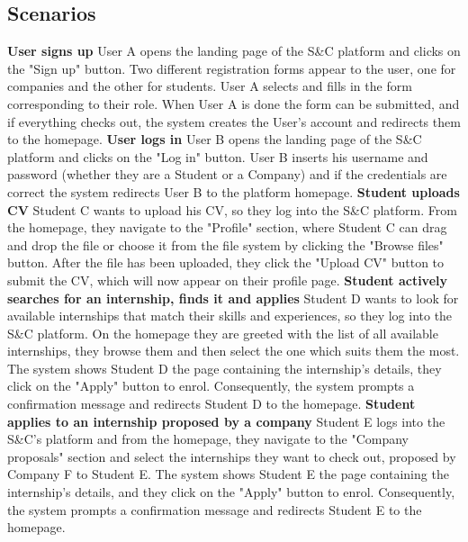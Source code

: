 \subsection{Scenarios }
\textbf{User signs up} \newline
User A opens the landing page of the S\&C platform and clicks on the "Sign up" button. Two different registration forms appear to the user, one for companies and the other for students. User A selects and fills in the form corresponding to their role. When User A is done the form can be submitted, and if everything checks out, the system creates the User's account and redirects them to the homepage.
\newline
\newline
\textbf{User logs in} \newline
User B opens the landing page of the S\&C platform and clicks on the "Log in" button. User B inserts his username and password (whether they are a Student or a Company) and if the credentials are correct the system redirects User B to the platform homepage.
\newline
\newline
\textbf{Student uploads CV}\newline
Student C wants to upload his CV, so they log into the S\&C platform. From the homepage, they navigate to the "Profile" section, where Student C can drag and drop the file or choose it from the file system by clicking the "Browse files" button.
After the file has been uploaded, they click the "Upload CV" button to submit the CV, which will now appear on their profile page.
\newline
\newline
\textbf{Student actively searches for an internship, finds it and applies}\newline
Student D wants to look for available internships that match their skills and experiences, so they log into the S\&C platform. On the homepage they are greeted with the list of all available internships, they browse them and then select the one which suits them the most.
The system shows Student D the page containing the internship's details, they click on the "Apply" button to enrol. Consequently, the system prompts a confirmation message and redirects Student D to the homepage.
\newline
\newline
\textbf{Student applies to an internship proposed by a company }\newline
Student E logs into the S\&C's platform and from the homepage, they navigate to the "Company proposals" section and select the internships they want to check out, proposed by Company F to Student E. The system shows Student E the page containing the internship's details, and they click on the "Apply" button to enrol. Consequently, the system prompts a confirmation message and redirects Student E to the homepage.

